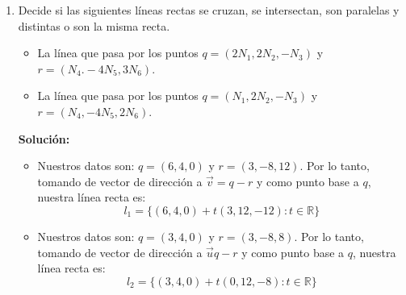 \documentclass{article}
\begin{document}
\begin{enumerate}
    \item Decide si las siguientes líneas rectas se cruzan, se intersectan, son paralelas y distintas o son la misma recta.
    \begin{itemize}
        \item La línea que pasa por los puntos $q = (2N_1, 2N_2, -N_3)$ y $r =(N_4.-4N_5,3N_6)$.
        \item La línea que pasa por los puntos $ q = (N_1, 2N_2, -N_3)$ y $r = (N_4,-4N_5, 2N_6)$.
    \end{itemize}
    \vspace*{10pt}
    
    \textbf{Solución:}
    \vspace{10pt}
    
    \begin{itemize}
        \item Nuestros datos son: $q = (6, 4, 0)$ y $r =(3,-8,12)$.
        Por lo tanto, tomando de vector de dirección a $\vec{v}=q-r$ y como punto base a $q$, nuestra línea recta es:
        $$l_1 =\{(6,4,0)+t(3,12,-12): t \in \mathbb{R}\}$$
        \item Nuestros datos son: $ q = (3, 4, 0)$ y $r = (3,-8, 8)$.
        Por lo tanto, tomando de vector de dirección a $\vec{u}q-r$ y como punto base a $q$, nuestra línea recta es:
        $$l_2 =\{(3,4,0)+t(0, 12,-8): t \in \mathbb{R}\}$$


\end{itemize}
\end{enumerate}
\end{document}
